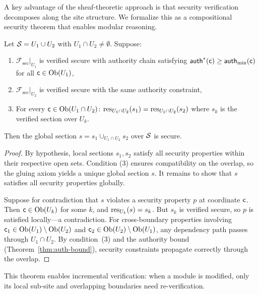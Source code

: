 \documentclass[11pt]{article}
\newcommand{\AuthLevel}{\mathsf{auth}}
\newcommand{\SecSheaf}{\mathcal{F}_{\mathrm{sec}}}
\begin{document}
A key advantage of the sheaf-theoretic approach is that security
verification decomposes along the site structure.  We formalize this
as a compositional security theorem that enables modular reasoning.

\begin{theorem}\label{thm:comp-sec}
Let $\mathcal{S} = U_1 \cup U_2$ with $U_1 \cap U_2 \neq \emptyset$.
Suppose:
\begin{enumerate}[noitemsep]
  \item $\SecSheaf|_{U_1}$ is verified secure with authority chain
        satisfying $\AuthLevel^*(\coord) \geq
        \AuthLevel_{\min}(\coord)$ for all $\mathsf{c} \in \mathrm{Ob}(U_1)$,
  \item $\SecSheaf|_{U_2}$ is verified secure with the same authority
        constraint,
  \item For every $\mathsf{c} \in \mathrm{Ob}(U_1 \cap U_2)$:
        $\mathrm{res}_{U_1 \cap U_2}(s_1) = \mathrm{res}_{U_1 \cap U_2}(s_2)$
        where $s_k$ is the verified section over $U_k$.
\end{enumerate}
Then the global section $s = s_1 \cup_{U_1 \cap U_2} s_2$ over
$\mathcal{S}$ is secure.
\end{theorem}

\begin{proof}
By hypothesis, local sections $s_1, s_2$ satisfy all security
properties within their respective open sets.  Condition (3) ensures
compatibility on the overlap, so the gluing axiom yields a unique
global section $s$.  It remains to show that $s$ satisfies all
security properties globally.

Suppose for contradiction that $s$ violates a security property $p$
at coordinate $\mathsf{c}$.  Then $\mathsf{c} \in \mathrm{Ob}(U_k)$ for some $k$, and
$\mathrm{res}_{U_k}(s) = s_k$.  But $s_k$ is verified secure, so $p$ is
satisfied locally---a contradiction.  For cross-boundary properties
involving $\mathsf{c}_1 \in \mathrm{Ob}(U_1) \setminus \mathrm{Ob}(U_2)$ and
$\mathsf{c}_2 \in \mathrm{Ob}(U_2) \setminus \mathrm{Ob}(U_1)$, any dependency path
passes through $U_1 \cap U_2$.  By condition~(3) and the authority
bound (Theorem~\ref{thm:auth-bound}), security constraints propagate
correctly through the overlap.
\end{proof}

This theorem enables incremental verification: when a module is
modified, only its local sub-site and overlapping boundaries need
re-verification.
\end{document}
